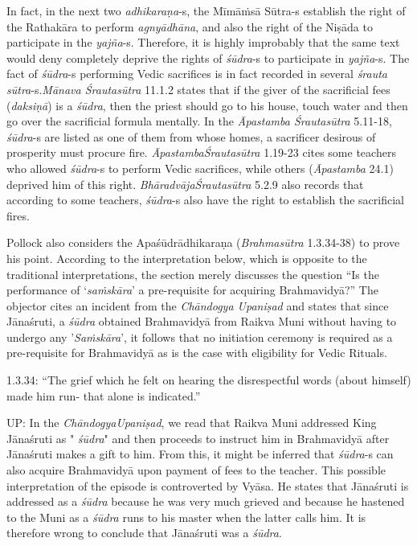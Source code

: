 In fact, in the next two \textit{adhikaraṇa}-s, the Mīmāṁsā Sūtra-s establish the right of the Rathakāra to perform \textit{agnyādhāna}, and also the right of the Niṣāda to participate in the \textit{yajña}-s. Therefore, it is highly improbably that the same text would deny completely deprive the rights of \textit{śūdra}-s to participate in \textit{yajña}-s. The fact of \textit{śūdra}-s performing Vedic sacrifices is in fact recorded in several \textit{śrauta sūtra}-s.\break \textit{Mānava Śrautasūtra} 11.1.2 states that if the giver of the sacrificial fees (\textit{daksiṇā}) is a \textit{śūdra}, then the priest should go to his house, touch water and then go over the sacrificial formula mentally. In the \textit{Āpastamba Śrautasūtra} 5.11-18, \textit{śūdra}-s are listed as one of them from whose homes, a sacrificer desirous of prosperity must procure fire. \textit{ĀpastambaŚrautasūtra} 1.19-23 cites some teachers who allowed \textit{śūdra}-s to perform Vedic sacrifices, while others (\textit{Āpastamba} 24.1) deprived him of this right. \textit{BhāradvājaŚrautasūtra} 5.2.9 also records that according to some teachers, \textit{śūdra}-s also have the right to establish the sacrificial fires.

Pollock also considers the Apaśūdrādhikaraṇa (\textit{Brahmasūtra} 1.3.34-38) to prove his point. According to the interpretation below, which is opposite to the traditional interpretations, the section merely discusses the question “Is the performance of ‘\textit{saṁskāra}’ a pre-requisite for acquiring Brahmavidyā?” The objector cites an incident from the \textit{Chāndogya Upaniṣad} and states that since Jānaśruti, a \textit{śūdra} obtained Brahmavidyā from Raikva Muni without having to undergo any '\textit{Saṁskāra}', it follows that no initiation ceremony is required as a pre-requisite for Brahmavidyā as is the case with eligibility for Vedic Rituals.

1.3.34: “The grief which he felt on hearing the disrespectful words (about himself) made him run- that alone is indicated.”

UP: In the \textit{ChāndogyaUpaniṣad}, we read that Raikva Muni addressed King Jānaśruti as "\textit{ śūdra}" and then proceeds to instruct him in Brahmavidyā after Jānaśruti makes a gift to him. From this, it might be inferred that \textit{śūdra}-s can also acquire Brahmavidyā upon payment of fees to the teacher. This possible interpretation of the episode is controverted by Vyāsa. He states that Jānaśruti is addressed as a \textit{śūdra} because he was very much grieved and because he hastened to the Muni as a \textit{śūdra} runs to his master when the latter calls him. It is therefore wrong to conclude that Jānaśruti was a \textit{śūdra}.

